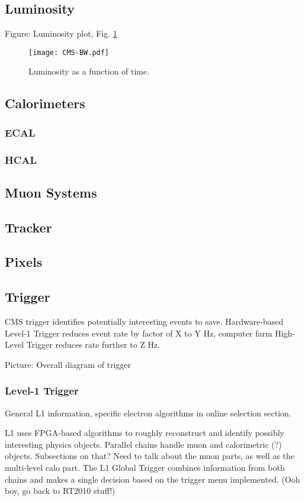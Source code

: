\subsection{Luminosity}
Figure: Luminosity plot, Fig. \ref{fig:LuminosityVsTime}

 \begin{figure}[htb]
  \begin{center}
    \texttt{[image: CMS-BW.pdf]}
  \end{center}
  \caption[Luminosity as a function of time]{Luminosity as a function of time.}
  \label{fig:LuminosityVsTime}
 \end{figure}

\subsection{Calorimeters}
\subsubsection{ECAL}
\subsubsection{HCAL}
\subsection{Muon Systems}
\subsection{Tracker}
\subsection{Pixels}
\subsection{Trigger}
CMS trigger identifies potentially interesting events to save.  
Hardware-based Level-1 Trigger reduces event rate by 
factor of X to Y Hz, computer farm High-Level Trigger reduces rate further to Z Hz.  

Picture: Overall diagram of trigger
\subsubsection{Level-1 Trigger}
General L1 information, specific electron algorithms in online selection section.  

L1 uses FPGA-based algorithms to roughly reconstruct and identify possibly interesting physics objects.  
Parallel chains handle muon and calorimetric (?) objects.  
Subsections on that?  Need to talk about the muon parts, as well as the multi-level calo part.  
The L1 Global Trigger combines information from both chains and makes a single decision based on the trigger menu implemented.  
(Ooh boy, go back to RT2010 stuff!)  

